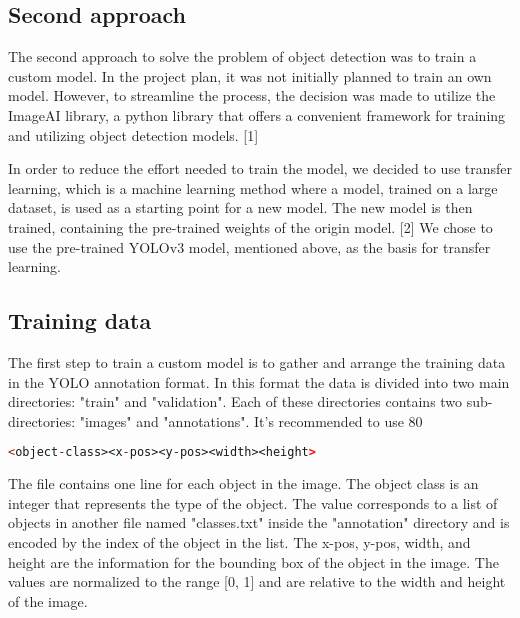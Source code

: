 \subsection{Second approach}

The second approach to solve the problem of object detection was to train a custom model. In the project plan, it was not initially planned to train an own model. However, to streamline the process, the decision was made to utilize the ImageAI library, a python library that offers a convenient framework for training and utilizing object detection models. [1]

In order to reduce the effort needed to train the model, we decided to use transfer learning, which is a machine learning method where a model, trained on a large dataset, is used as a starting point for a new model. The new model is then trained, containing the pre-trained weights of the origin model. [2] We chose to use the pre-trained YOLOv3 model, mentioned above, as the basis for transfer learning. 

\subsection{Training data }

The first step to train a custom model is to gather and arrange the training data in the YOLO annotation format. In this format the data is divided into two main directories: "train" and "validation". Each of these directories contains two sub-directories: "images" and "annotations". It's recommended to use 80%

\begin{lstlisting}[language=prolog]
<object-class><x-pos><y-pos><width><height>
\end{lstlisting}

The file contains one line for each object in the image. The object class is an integer that represents the type of the object. The value corresponds to a list of objects in another file named "classes.txt" inside the "annotation" directory and is encoded by the index of the object in the list. The x-pos, y-pos, width, and height are the information for the bounding box of the object in the image. The values are normalized to the range [0, 1] and are relative to the width and height of the image.

